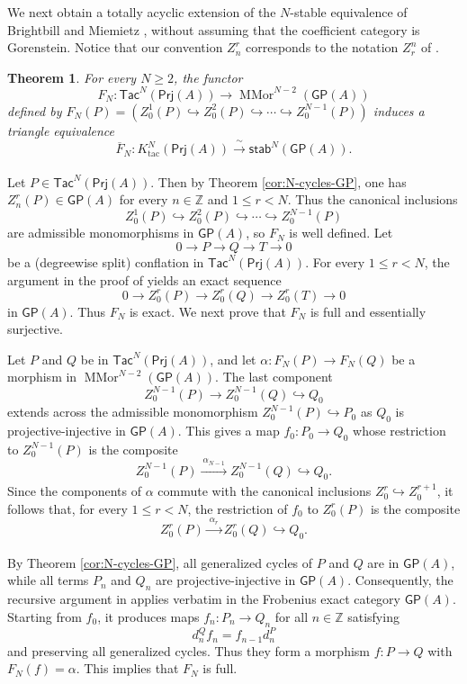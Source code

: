 \documentclass{amsart}
\theoremstyle{bfupright head,slanted body}
\theoremstyle{bfupright head,upright body}
\theoremstyle{fixed bf head,slanted body}
\newtheorem{thm}[res]{Theorem}          \newtheorem*{thm*}{Theorem}
\theoremstyle{fixed bf head,upright body}
\theoremstyle{numbered paragraph}
\newenvironment{prf*}[1][Proof]{%
	\begin{proof}[\bf #1]
		\setcounter{equation}{0}
		\renewcommand{\theequation}{\arabic{equation}}}
	{\end{proof}
}
\numberwithin{equation}{res}
\newcommand{\GP}[1]{\mathsf{GP}(#1)}
\newcommand{\Prj}[1]{\mathsf{Prj}(#1)}
\newcommand{\xra}[2][]{\xrightarrow[#1]{\:#2\:}}
\begin{document}
We next obtain a totally acyclic extension of the $N$-stable equivalence of Brightbill and Miemietz \cite[Theorem 4.12]{BM24}, without assuming that the coefficient category is Gorenstein. Notice that our convention $Z_n^r$ corresponds to the notation $Z_r^n$ of \cite{BM24}.

\begin{thm}\label{thm:N-stable-total}
For every $N\geq2$, the functor
$$F_N:\mathsf{Tac}^N(\Prj A)\to\operatorname{MMor}^{N-2}(\GP{A})$$
defined by $F_N(P)=(Z_0^1(P)\hookrightarrow Z_0^2(P)\hookrightarrow\cdots
\hookrightarrow Z_0^{N-1}(P))$ induces a triangle equivalence
$$\overline F_N: K^N_{\mathrm{tac}}(\Prj A)\xra{\sim}
\mathsf{stab}^N(\GP{A}).$$
\end{thm}

\begin{prf*}
Let $P\in\mathsf{Tac}^N(\Prj A)$. Then by Theorem \ref{cor:N-cycles-GP}, one has $Z_n^r(P)\in\GP{A}$ for every $n\in\mathbb Z$ and $1\leq r<N$. Thus the canonical inclusions
$$Z_0^1(P)\hookrightarrow Z_0^2(P)\hookrightarrow\cdots
\hookrightarrow Z_0^{N-1}(P)$$
are admissible monomorphisms in $\GP{A}$, so $F_N$ is well defined. Let
$$0\to P\to Q\to T\to 0$$
be a (degreewise split) conflation in $\mathsf{Tac}^N(\Prj A)$. For every $1\leq r<N$, the argument in the proof of
\cite[Proposition 4.7]{BM24} yields an exact sequence
$$0\to Z_0^r(P)\to Z_0^r(Q)\to Z_0^r(T)\to 0$$
in $\GP{A}$. Thus $F_N$ is exact. We next prove that $F_N$ is full and essentially surjective.

Let $P$ and $Q$ be in $\mathsf{Tac}^N(\Prj A)$, and let $\alpha: F_N(P)\to F_N(Q)$ be a morphism in $\operatorname{MMor}^{N-2}(\GP{A})$. The last component
$$Z_0^{N-1}(P)\to Z_0^{N-1}(Q)\hookrightarrow Q_0$$
extends across the admissible monomorphism $Z_0^{N-1}(P)\hookrightarrow P_0$ as $Q_0$ is projective-injective in $\GP{A}$. This gives a map $f_0:P_0\to Q_0$ whose restriction to $Z_0^{N-1}(P)$ is the composite
$$Z_0^{N-1}(P)\xra{\alpha_{N-1}} Z_0^{N-1}(Q)\hookrightarrow Q_0.$$
Since the components of $\alpha$ commute with the canonical inclusions $Z_0^r\hookrightarrow Z_0^{r+1}$, it follows that, for every $1\leq r<N$, the restriction of $f_0$ to $Z_0^r(P)$ is the composite $$Z_0^r(P)\xra{\alpha_r}Z_0^r(Q)\hookrightarrow Q_0.$$

By Theorem \ref{cor:N-cycles-GP}, all generalized cycles of $P$ and $Q$ are in $\GP{A}$, while all terms $P_n$ and $Q_n$ are projective-injective in $\GP{A}$. Consequently, the recursive argument in \cite[Proposition 4.3]{BM24} applies verbatim in the Frobenius exact category $\GP{A}$. Starting from $f_0$, it produces maps $f_n:P_n\to Q_n$ for all $n\in\mathbb Z$ satisfying
$$d_n^Qf_n=f_{n-1}d_n^P$$
and preserving all generalized cycles. Thus they form a morphism $f: P\to Q$ with $F_N(f)=\alpha$. This implies that $F_N$ is full.


\end{prf*}
\end{document}
